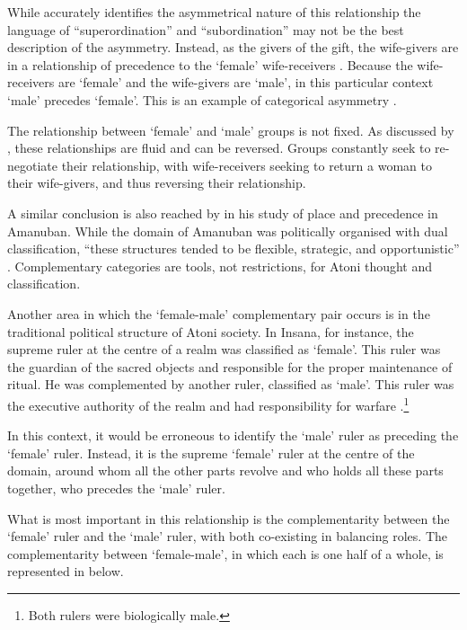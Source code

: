 While \citeauthor{scno71} accurately identifies the asymmetrical
nature of this relationship the language of ``superordination'' and ``subordination''
may not be the best description of the asymmetry.
Instead, as the givers of the gift, the wife-givers
are in a relationship of precedence to the  `female' wife-receivers \citep{fo94,fo99}.
Because the wife-receivers are  `female' and the wife-givers are  `male',
in this particular context  `male' precedes  `female'.
This is an example of categorical asymmetry \citep[47]{fo94}.

The relationship between  `female' and  `male' groups is not fixed.
As discussed by \cite{fo99}, these relationships are fluid and can be reversed.
Groups constantly seek to re-negotiate their relationship,
with wife-receivers seeking to return a woman to their wife-givers,
and thus reversing their relationship.

A similar conclusion is also reached by \cite{mcw02}
in his study of place and precedence in Amanuban.
While the domain of Amanuban was politically organised with
dual classification, ``these structures tended to
be flexible, strategic, and opportunistic'' \cite[287]{mcw02}.
Complementary categories are tools, not restrictions,
for Atoni thought and classification.

Another area in which the  `female-male'
complementary pair occurs is in the traditional political structure of Atoni society.
In Insana, for instance, the supreme ruler at the centre of a realm
was classified as  `female'.
This  ruler was the guardian of the sacred objects
and responsible for the proper maintenance of ritual.
He was complemented by another ruler, classified as  `male'.
This  ruler was the executive authority of the realm
and had responsibility for warfare \citep[371ff]{scno71}.\footnote{
		Both rulers were biologically male.}

In this context, it would be erroneous to identify
the  `male' ruler as preceding the  `female' ruler.
Instead, it is the supreme  `female' ruler at the centre of the domain,
around whom all the other parts revolve and who holds all these parts together,
who precedes the  `male' ruler.

What is most important in this relationship is the complementarity between
the  `female' ruler and the  `male' ruler,
with both co-existing in balancing roles.
The complementarity between  `female-male',
in which each is one half of a whole,
is represented in  below.

